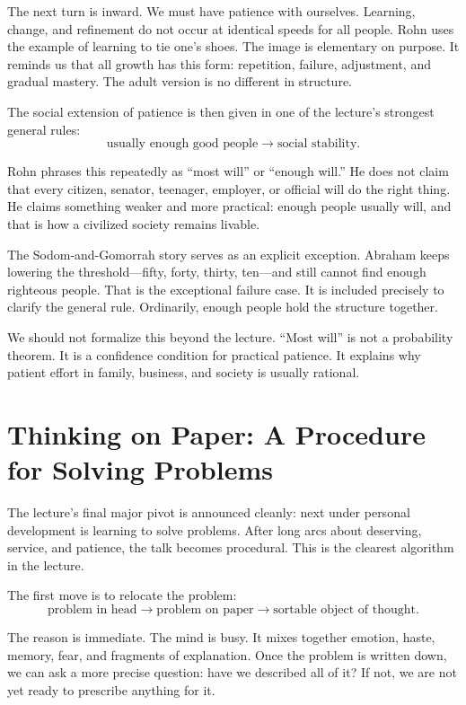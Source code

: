 The next turn is inward. We must have patience with ourselves. Learning, change, and refinement do not occur at identical speeds for all people. Rohn uses the example of learning to tie one's shoes. The image is elementary on purpose. It reminds us that all growth has this form: repetition, failure, adjustment, and gradual mastery. The adult version is no different in structure.

The social extension of patience is then given in one of the lecture's strongest general rules:
\begin{equation}
\text{usually enough good people} \rightarrow \text{social stability}.
\end{equation}

Rohn phrases this repeatedly as ``most will'' or ``enough will.'' He does not claim that every citizen, senator, teenager, employer, or official will do the right thing. He claims something weaker and more practical: enough people usually will, and that is how a civilized society remains livable.

The Sodom-and-Gomorrah story serves as an explicit exception. Abraham keeps lowering the threshold---fifty, forty, thirty, ten---and still cannot find enough righteous people. That is the exceptional failure case. It is included precisely to clarify the general rule. Ordinarily, enough people hold the structure together.

We should not formalize this beyond the lecture. ``Most will'' is not a probability theorem. It is a confidence condition for practical patience. It explains why patient effort in family, business, and society is usually rational.

\section{Thinking on Paper: A Procedure for Solving Problems}

The lecture's final major pivot is announced cleanly: next under personal development is learning to solve problems. After long arcs about deserving, service, and patience, the talk becomes procedural. This is the clearest algorithm in the lecture.

The first move is to relocate the problem:
\begin{equation}
\text{problem in head} \rightarrow \text{problem on paper} \rightarrow \text{sortable object of thought}.
\end{equation}

The reason is immediate. The mind is busy. It mixes together emotion, haste, memory, fear, and fragments of explanation. Once the problem is written down, we can ask a more precise question: have we described all of it? If not, we are not yet ready to prescribe anything for it.


